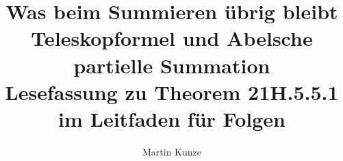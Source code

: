 \documentclass[a4paper,11pt]{article}
\title{Was beim Summieren übrig bleibt\\[.5em]
\large Teleskopformel und Abelsche partielle Summation\\
Lesefassung zu Theorem 21H.5.5.1 im Leitfaden für Folgen}
\author{Martin Kunze}
\date{}
\begin{document}
\maketitle
\hypertarget{abel.reading}{}


\end{document}

